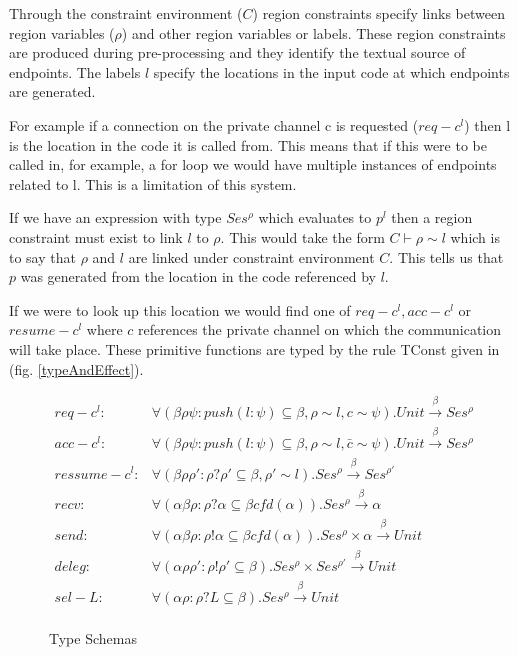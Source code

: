 Through the constraint environment ($C$) region constraints specify links between region variables ($\rho$) and other region variables or labels. These region constraints are produced during pre-processing and they identify the textual source of endpoints. The labels $l$ specify the locations in the input code at which endpoints are generated.

For example if a connection on the private channel c is requested ($req-c^l$) then l is the location in the code it is called from. This means that if this were to be called in, for example, a for loop we would have multiple instances of endpoints related to l. This is a limitation of this system. 

If we have an expression with type $Ses^\rho$ which evaluates to $p^l$ then a region constraint must exist to link $l$ to $\rho$. This would take the form $C\vdash \rho  \sim l$ which is to say that $\rho$ and $l$ are linked under constraint environment $C$. This tells us that $p$ was generated from the location in the code referenced by $l$.

If we were to look up this location we would find one of $req-c^l, acc-c^l$ or $resume-c^l$ where $c$ references the private channel on which the communication will take place. These primitive functions are typed by the rule TConst given in (fig. \ref{typeAndEffect}).

\begin{figure}
\begin{align*}
 req-c^l : & \forall(\beta \rho \psi:push(l:\psi) \subseteq \beta, \rho \sim l, c \sim \psi).Unit  \overset{\beta}{\rightarrow} Ses^\rho\\ 
 acc-c^l : & \forall(\beta \rho \psi:push(l:\psi) \subseteq \beta, \rho \sim l, \bar{c} \sim \psi).Unit  \overset{\beta}{\rightarrow} Ses^\rho \\
 ressume-c^l :&  \forall(\beta \rho \rho':\rho ? \rho' \subseteq \beta, \rho' \sim l).Ses^{\rho}  \overset{\beta}{\rightarrow} Ses^{\rho'} \\
 recv : &\forall(\alpha \beta \rho : \rho ? \alpha \subseteq \beta cfd(\alpha)).Ses^{\rho} \overset{\beta}{\rightarrow} \alpha \\
 send : &\forall(\alpha \beta \rho : \rho ! \alpha \subseteq \beta cfd(\alpha)).Ses^{\rho} \times \alpha \overset{\beta}{\rightarrow} Unit \\
 deleg :& \forall(\alpha \rho \rho' : \rho ! \rho' \subseteq \beta ).Ses^{\rho} \times Ses^{\rho'} \overset{\beta}{\rightarrow} Unit \\
 sel-L :& \forall(\alpha \rho : \rho ? L \subseteq \beta ).Ses^{\rho}  \overset{\beta}{\rightarrow} Unit \\
\end{align*}
\caption{Type Schemas}
\label{ts}
\end{figure}


